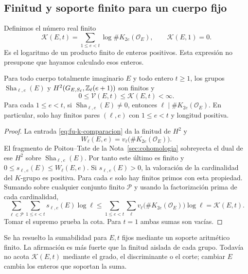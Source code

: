 \subsection{Finitud y soporte finito para un cuerpo fijo}

Definimos el número real finito
\begin{equation}
 \mathcal K(E,t)=\sum_{1\le e<t}\log\#K_{2e}(\mathcal O_E),
 \qquad \mathcal K(E,1)=0.
 \label{eq:fu-k-presupuesto}
\end{equation}
Es el logaritmo de un producto finito de enteros positivos.
Esta expresión no presupone que hayamos calculado esos enteros.

\begin{proposicion}
\label{prop:fu-finitud}
Para todo cuerpo totalmente imaginario $E$ y todo entero $t\ge1$,
los grupos $\operatorname{Sha}_{\ell,e}(E)$ y
$H^2(G_{E,S_\ell},\mathbb{Z}_\ell(e+1))$ son finitos y
\begin{equation}
 0\le\mathcal V(E,t)\le\mathcal K(E,t)<\infty.
 \label{eq:fu-v-menor-k}
\end{equation}
Para cada $1\le e<t$, si
$\operatorname{Sha}_{\ell,e}(E)\ne0$, entonces
$\ell\mid\#K_{2e}(\mathcal O_E)$. En particular, solo hay
finitos pares $(\ell,e)$ con $1\le e<t$ y longitud positiva.
\end{proposicion}

\begin{proof}
La entrada \eqref{eq:fu-k-comparacion} da la finitud de $H^2$ y
\[
 W_\ell(E,e)=v_\ell\bigl(\#K_{2e}(\mathcal O_E)\bigr).
\]
El fragmento de Poitou--Tate de la Nota~\ref{sec:cohomologia}
sobreyecta el dual de ese $H^2$ sobre
$\operatorname{Sha}_{\ell,e}(E)$. Por tanto este último es
finito y $0\le s_{\ell,e}(E)\le W_\ell(E,e)$.
Si $s_{\ell,e}(E)>0$, la valoración de la cardinalidad del
$K$-grupo es positiva. Para cada $e$ solo hay finitos primos
con esta propiedad. Sumando sobre cualquier conjunto finito
$\mathcal P$ y usando la factorización prima de cada cardinalidad,
\[
 \sum_{\ell\in\mathcal P}\sum_{1\le e<t}s_{\ell,e}(E)\log\ell
 \le\sum_{1\le e<t}\sum_\ell
     v_\ell\bigl(\#K_{2e}(\mathcal O_E)\bigr)\log\ell
 =\mathcal K(E,t).
\]
Tomar el supremo prueba la cota. Para $t=1$ ambas sumas son vacías.
\end{proof}

Se ha resuelto la sumabilidad para $E,t$ fijos mediante un soporte
aritmético finito. La afirmación es más fuerte que la finitud aislada
de cada grupo. Todavía no acota $\mathcal K(E,t)$ mediante el grado,
el discriminante o el corte; cambiar $E$ cambia los enteros que
soportan la suma.

